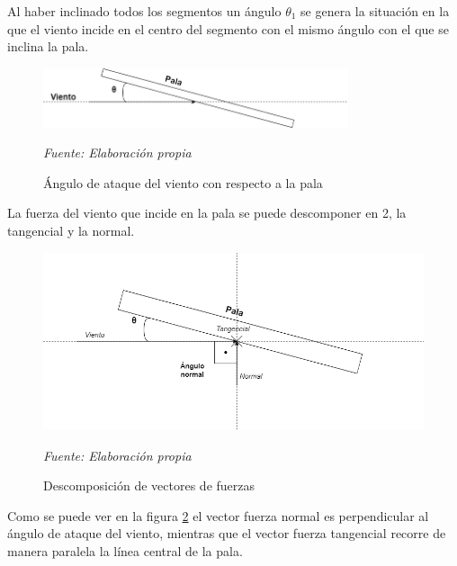 Al haber inclinado todos los segmentos un ángulo $ \theta_1 $ se genera la situación en la que el viento incide en el centro del segmento con el mismo ángulo con el que se inclina la pala. \\

    \textbf{}
    \begin{figure}[H]
    \centering
    \includegraphics[width=0.8\textwidth]{images/dibujo angulo ataque.drawio.png}
    \caption{Ángulo de ataque del viento con respecto a la pala}
    \textit{Fuente: Elaboración propia}
    \label{fig:dibujo_angulo_ataque}
\end{figure}

La fuerza del viento que incide en la pala se puede descomponer en 2, la tangencial y la normal. \\

    \textbf{}
    \begin{figure}[H]
    \centering
    \includegraphics[width=1\textwidth]{images/dibujo fuerzas.drawio.png}
    \caption{Descomposición de vectores de fuerzas}
    \textit{Fuente: Elaboración propia}
    \label{fig:dibujo_fuerzas}
\end{figure}


Como se puede ver en la figura \ref{fig:dibujo_fuerzas} el vector fuerza normal es perpendicular al ángulo de ataque del viento, mientras que el vector fuerza tangencial recorre de manera paralela la línea central de la pala.


